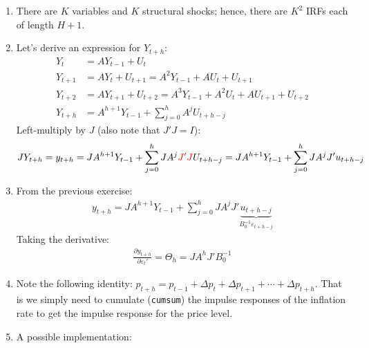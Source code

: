 \begin{enumerate}
\item There are \(K\) variables and \(K\) structural shocks; hence, there are \(K^2\) IRFs each of length \(H+1\).

\item Let's derive an expression for \(Y_{t+h}\):
\begin{align*}
Y_t &= A Y_{t-1} + U_t
\\
Y_{t+1} &= A Y_{t} + U_{t+1} = A^2 Y_{t-1} + A U_t + U_{t+1}
\\
Y_{t+2} &= A Y_{t+1} + U_{t+2} = A^3 Y_{t-1} + A^2 U_t + A U_{t+1} + U_{t+2}
\\
Y_{t+h} &= A^{h+1} Y_{t-1} + \sum_{j=0}^h A^j U_{t+h-j}
\end{align*}
Left-multiply by \(J\) (also note that \(J'J=I\)):
\begin{align*}
J Y_{t+h} = y_{t+h} = J A^{h+1} Y_{t-1} + \sum_{j=0}^h J A^j \textcolor{red}{J'J} U_{t+h-j} = J A^{h+1} Y_{t-1} + \sum_{j=0}^h J A^j J' u_{t+h-j}
\end{align*}

\item From the previous exercise:
\begin{align*}
y_{t+h} = J A^{h+1} Y_{t-1} + \sum_{j=0}^h J A^j J' \underbrace{u_{t+h-j}}_{B_0^{-1} \varepsilon_{t+h-j}}
\end{align*}
Taking the derivative:
\begin{align*}
\frac{\partial y_{t+h}}{\partial \varepsilon_{t}'} = \Theta_h = J A^h J' B_0^{-1}
\end{align*}
\item Note the following identity: \(p_{t+h}=p_{t-1}+\Delta p_t +\Delta p_{t+1} + \cdots  +\Delta p_{t+h}\).
That is we simply need to cumulate (\texttt{cumsum}) the impulse responses of the inflation rate to get the impulse response for the price level.
	
\item A possible implementation:


\end{enumerate}